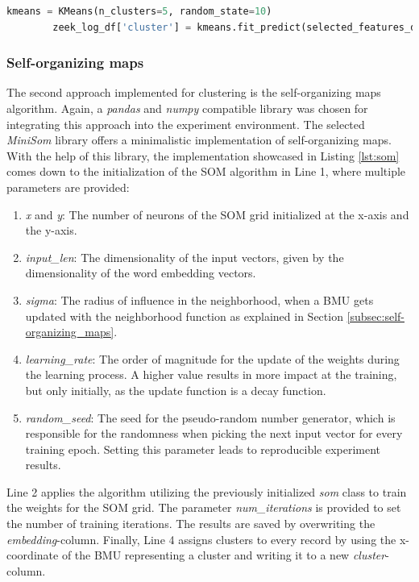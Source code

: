 \documentclass[
    fontsize=12pt,
    headings=small,
    parskip=half,           %
    bibliography=totoc,
    numbers=noenddot,       %
    open=any,               %
    ]{scrreprt}
\begin{document}
\begin{minipage}\linewidth
	\begin{lstlisting}[language={python}, caption={Application of k-means clustering on the previously calculated embeddings}, label={lst:k_means}] 
		kmeans = KMeans(n_clusters=5, random_state=10)
		zeek_log_df['cluster'] = kmeans.fit_predict(selected_features_df['embedding'].tolist())
	\end{lstlisting}
\end{minipage}



\subsubsection{Self-organizing maps}
The second approach implemented for clustering is the self-organizing maps algorithm. Again, a \emph{pandas} and \emph{numpy} compatible library was chosen for integrating this approach into the experiment environment. The selected \emph{MiniSom} library \cite{vettigliminisom} offers a minimalistic implementation of self-organizing maps. With the help of this library, the implementation showcased in Listing \ref{lst:som} comes down to the initialization of the SOM algorithm in Line 1, where multiple parameters are provided:
\begin{enumerate}
	\item \emph{x} and \emph{y}: The number of neurons of the SOM grid initialized at the x-axis and the y-axis.
	\item \emph{input\_len}: The dimensionality of the input vectors, given by the dimensionality of the word embedding vectors.
	\item \emph{sigma}: The radius of influence in the neighborhood, when a BMU gets updated with the neighborhood function as explained in Section \ref{subsec:self-organizing_maps}.
	\item \emph{learning\_rate}: The order of magnitude for the update of the weights during the learning process. A higher value results in more impact at the training, but only initially, as the update function is a decay function.
	\item \emph{random\_seed}: The seed for the pseudo-random number generator, which is responsible for the randomness when picking the next input vector for every training epoch. Setting this parameter leads to reproducible experiment results.
\end{enumerate}

Line 2 applies the algorithm utilizing the previously initialized \emph{som} class to train the weights for the SOM grid. The parameter \emph{num\_iterations} is provided to set the number of training iterations. The results are saved by overwriting the \emph{embedding}-column. Finally, Line 4 assigns clusters to every record by using the x-coordinate of the BMU representing a cluster and writing it to a new \emph{cluster}-column.
\end{document}
